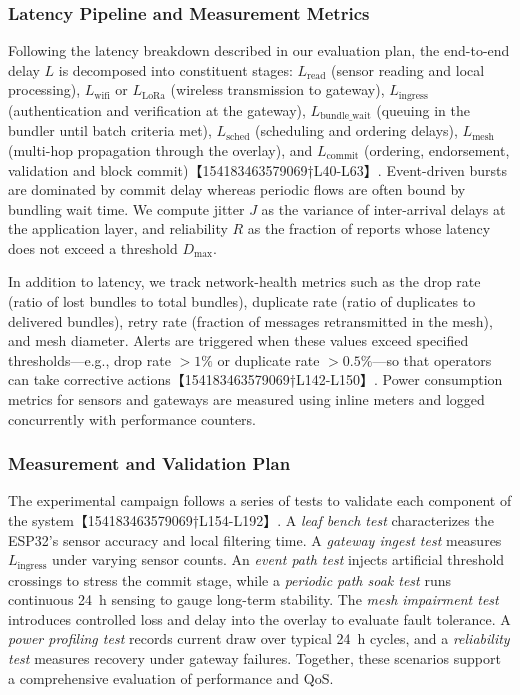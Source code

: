 \documentclass[12pt,onecolumn]{IEEEtran} %
\begin{document}
\subsubsection{Latency Pipeline and Measurement Metrics}
Following the latency breakdown described in our evaluation plan, the end-to-end delay $L$ is decomposed into constituent stages: $L_{\text{read}}$ (sensor reading and local processing), $L_{\text{wifi}}$ or $L_{\text{LoRa}}$ (wireless transmission to gateway), $L_{\text{ingress}}$ (authentication and verification at the gateway), $L_{\text{bundle\_wait}}$ (queuing in the bundler until batch criteria met), $L_{\text{sched}}$ (scheduling and ordering delays), $L_{\text{mesh}}$ (multi-hop propagation through the overlay), and $L_{\text{commit}}$ (ordering, endorsement, validation and block commit)【154183463579069†L40-L63】.  Event-driven bursts are dominated by commit delay whereas periodic flows are often bound by bundling wait time.  We compute jitter $J$ as the variance of inter-arrival delays at the application layer, and reliability $R$ as the fraction of reports whose latency does not exceed a threshold $D_{\max}$.

In addition to latency, we track network-health metrics such as the drop rate (ratio of lost bundles to total bundles), duplicate rate (ratio of duplicates to delivered bundles), retry rate (fraction of messages retransmitted in the mesh), and mesh diameter.  Alerts are triggered when these values exceed specified thresholds—e.g., drop rate $>1\%$ or duplicate rate $>0.5\%$—so that operators can take corrective actions【154183463579069†L142-L150】.  Power consumption metrics for sensors and gateways are measured using inline meters and logged concurrently with performance counters.

\subsubsection{Measurement and Validation Plan}
The experimental campaign follows a series of tests to validate each component of the system【154183463579069†L154-L192】.  A \emph{leaf bench test} characterizes the ESP32's sensor accuracy and local filtering time.  A \emph{gateway ingest test} measures $L_{\text{ingress}}$ under varying sensor counts.  An \emph{event path test} injects artificial threshold crossings to stress the commit stage, while a \emph{periodic path soak test} runs continuous 24~h sensing to gauge long-term stability.  The \emph{mesh impairment test} introduces controlled loss and delay into the overlay to evaluate fault tolerance.  A \emph{power profiling test} records current draw over typical 24~h cycles, and a \emph{reliability test} measures recovery under gateway failures.  Together, these scenarios support a comprehensive evaluation of performance and QoS.
\end{document}

